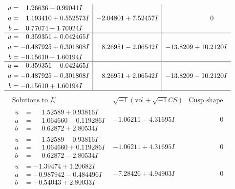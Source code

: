 \documentclass[1p]{elsarticle_modified}
\theoremstyle{definition}
\newcommand{\I}{\sqrt{-1}}
\begin{document}
$$\begin{array}{c|c|c}
\begin{aligned}
u &= \phantom{-}1.26636 - 0.99041 I \\
a &= \phantom{-}1.193410 + 0.552573 I \\
b &= \phantom{-}0.77074 - 1.70024 I\end{aligned}
 & -2.04801 + 7.52457 I & \phantom{-0.000000 } 0 \\ \hline\begin{aligned}
u &= \phantom{-}0.359351 + 0.042465 I \\
a &= -0.487925 + 0.301808 I \\
b &= -0.15610 - 1.60194 I\end{aligned}
 & \phantom{-}8.26951 - 2.06542 I & -13.8209 + 10.2120 I \\ \hline\begin{aligned}
u &= \phantom{-}0.359351 - 0.042465 I \\
a &= -0.487925 - 0.301808 I \\
b &= -0.15610 + 1.60194 I\end{aligned}
 & \phantom{-}8.26951 + 2.06542 I & -13.8209 - 10.2120 I\\
 \hline 
 \end{array}$$\newpage$$\begin{array}{c|c|c}  
\text{Solutions to }I^u_{2}& \I (\text{vol} + \sqrt{-1}CS) & \text{Cusp shape}\\
 \hline 
\begin{aligned}
u &= \phantom{-}1.52589 + 0.93816 I \\
a &= \phantom{-}1.064660 - 0.119286 I \\
b &= \phantom{-}0.62872 + 2.80534 I\end{aligned}
 & -1.06211 - 4.31695 I & \phantom{-0.000000 } 0 \\ \hline\begin{aligned}
u &= \phantom{-}1.52589 - 0.93816 I \\
a &= \phantom{-}1.064660 + 0.119286 I \\
b &= \phantom{-}0.62872 - 2.80534 I\end{aligned}
 & -1.06211 + 4.31695 I & \phantom{-0.000000 } 0 \\ \hline\begin{aligned}
u &= -1.39474 + 1.20682 I \\
a &= -0.987942 - 0.484496 I \\
b &= -0.54043 + 2.80033 I\end{aligned}
 & -7.28426 + 4.94903 I & \phantom{-0.000000 } 0 \\ \hline\begin{aligned}

\end{aligned}
\end{array}$$
\end{document}
